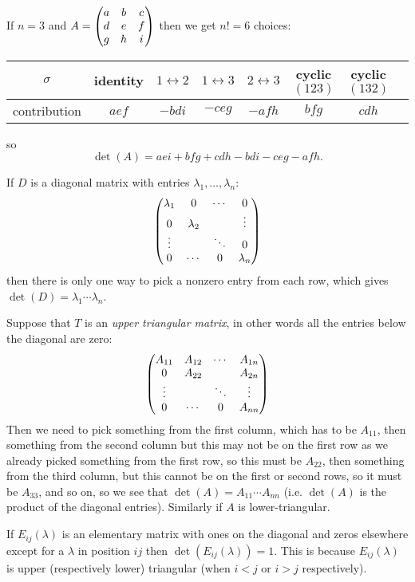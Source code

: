 \documentclass{article}
\begin{document}
\begin{Example}\label{exm:det3}
If \(n=3\) and \(A=\begin{pmatrix} a & b & c \\ d & e & f \\ g & h & i \end{pmatrix}\)
then we get \(n!=6\) choices:


\begin{tabular}{c|ccccccc}
\hline
\(\sigma\) & identity & \(1\leftrightarrow 2\) & \(1\leftrightarrow 3\) & \(2\leftrightarrow 3\) & cyclic \((123)\) & cyclic \((132)\) \\
\hline
contribution & \(aef\) & \(-bdi\) & \(-ceg\) & \(-afh\) & \(bfg\) & \(cdh\)\\
\hline
\end{tabular}


so
\[\det(A)=aei+bfg+cdh-bdi-ceg-afh.\]


\end{Example}
\begin{Example}\label{exm:diagonal}
If \(D\) is a diagonal matrix with entries
\(\lambda_1,\ldots,\lambda_n\):
\[\begin{pmatrix} \lambda_1 & 0 & \cdots & 0\\ 0 & \lambda_2 & & \vdots
\\ \vdots & & \ddots & 0 \\ 0 & \cdots & 0 &\lambda_n\end{pmatrix}\]
then there is only one way to pick a
nonzero entry from each row, which gives
\(\det(D)=\lambda_1\cdots\lambda_n\).


\end{Example}
\begin{Example}\label{exm:uppertriangular}
Suppose that \(T\) is an {\em upper triangular matrix}, in other
words all the entries below the diagonal are zero: \[\begin{pmatrix} A_{11} &
A_{12} & \cdots & A_{1n}\\ 0 & A_{22} & & A_{2n} \\ \vdots & &
\ddots & \vdots \\ 0 & \cdots & 0 & A_{nn}\end{pmatrix}\] Then we need to pick
something from the first column, which has to be \(A_{11}\), then
something from the second column but this may not be on the first
row as we already picked something from the first row, so this must
be \(A_{22}\), then something from the third column, but this cannot
be on the first or second rows, so it must be \(A_{33}\), and so on,
so we see that \(\det(A)=A_{11}\cdots A_{nn}\) (i.e. \(\det(A)\) is
the product of the diagonal entries). Similarly if \(A\) is
lower-triangular.


\end{Example}
\begin{Example}\label{exm:detelemI}
If \(E_{ij}(\lambda)\) is an elementary matrix with ones on the
diagonal and zeros elsewhere except for a \(\lambda\) in position
\(ij\) then \(\det(E_{ij}(\lambda))=1\). This is because
\(E_{ij}(\lambda)\) is upper (respectively lower) triangular (when
\(i<j\) or \(i>j\) respectively).


\end{Example}
\end{document}
